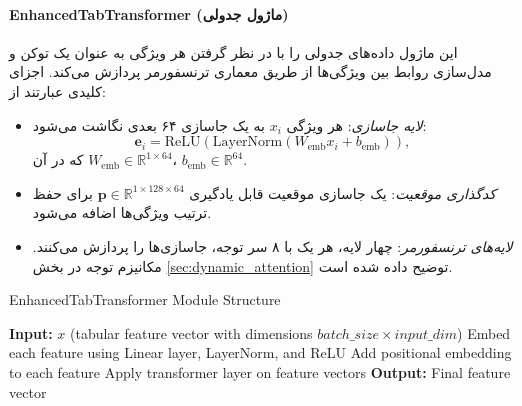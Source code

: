 \paragraph{EnhancedTabTransformer (ماژول جدولی)}
این ماژول داده‌های جدولی را با در نظر گرفتن هر ویژگی به عنوان یک توکن و مدل‌سازی روابط بین ویژگی‌ها از طریق معماری ترنسفورمر پردازش می‌کند. اجزای کلیدی عبارتند از:
\begin{itemize}
    \item \textit{لایه جاسازی}: هر ویژگی \( x_i \) به یک جاسازی ۶۴ بعدی نگاشت می‌شود:
    \[
    \mathbf{e}_i = \text{ReLU}(\text{LayerNorm}(W_{\text{emb}} x_i + b_{\text{emb}})),
    \]
    که در آن \( W_{\text{emb}} \in \mathbb{R}^{1 \times 64} \)، \( b_{\text{emb}} \in \mathbb{R}^{64} \).
    \item \textit{کدگذاری موقعیت}: یک جاسازی موقعیت قابل یادگیری \( \mathbf{p} \in \mathbb{R}^{1 \times 128 \times 64} \) برای حفظ ترتیب ویژگی‌ها اضافه می‌شود.
    \item \textit{لایه‌های ترنسفورمر}: چهار لایه، هر یک با ۸ سر توجه، جاسازی‌ها را پردازش می‌کنند. مکانیزم توجه در بخش \ref{sec:dynamic_attention} توضیح داده شده است.
\end{itemize}
\begin{LTR}
\begin{algorithm}[h]
\caption{EnhancedTabTransformer Module Structure}
\begin{algorithmic}[1]
\STATE \textbf{Input:} $x$ (tabular feature vector with dimensions $batch\_size \times input\_dim$)
\STATE Embed each feature using Linear layer, LayerNorm, and ReLU
\STATE Add positional embedding to each feature
    \STATE Apply transformer layer on feature vectors
\ENDFOR
\STATE \textbf{Output:} Final feature vector
\end{algorithmic}
\end{algorithm}
\end{LTR}


